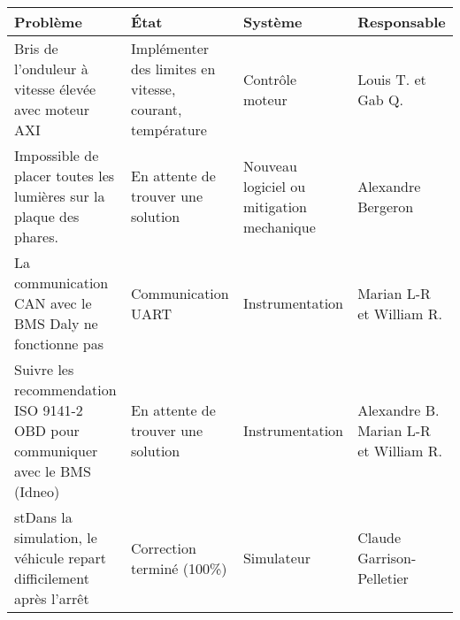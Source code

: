 \begin{tabularx}{\linewidth}{
    |>{\hsize=1.5\hsize}X|%
    >{\hsize=0.5\hsize}X|%
    >{\hsize=0.5\hsize}X|%
    >{\hsize=0.5\hsize}X|%
  }
    \hline
    \textbf{Problème} & \textbf{État} & \textbf{Système} & \textbf{Responsable}\\\hline
    Bris de l'onduleur à vitesse élevée avec moteur AXI & Implémenter des limites en vitesse, courant, température & Contrôle moteur & Louis T. et Gab Q.\\\hline
   Impossible de placer toutes les lumières sur la plaque des phares. & En attente de trouver une solution & Nouveau logiciel ou mitigation mechanique & Alexandre Bergeron \\\hline %
   La communication CAN avec le BMS Daly ne fonctionne pas & Communication UART & Instrumentation & Marian L-R et William R.\\\hline %
   Suivre les recommendation ISO 9141-2 OBD pour communiquer avec le BMS (Idneo) & En attente de trouver une solution & Instrumentation & Alexandre B. Marian L-R et William R.\\\hline %
   st{Dans la simulation, le véhicule repart difficilement après l'arrêt} & Correction terminé (100\%) & Simulateur & Claude Garrison-Pelletier\\\hline %
  \end{tabularx}
    
    

